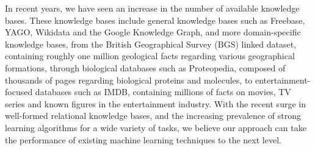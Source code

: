 \documentclass[twoside,11pt]{article}
\theoremstyle{definition}
\begin{document}
In recent years, we have seen an increase in the number of available knowledge bases. These knowledge bases include general knowledge bases such as Freebase, YAGO, Wikidata and the Google Knowledge Graph, and more domain-specific knowledge bases,  from the British Geographical Survey (BGS) linked dataset, containing roughly one million geological facts regarding various geographical formations, through biological databases such as Proteopedia, composed of thousands of pages regarding biological proteins and molecules, to entertainment-focused databases such as IMDB, containing millions of facts on movies, TV series and known figures in the entertainment industry. 
With the recent surge in well-formed relational knowledge bases,
and the increasing prevalence of strong learning algorithms for a wide variety of tasks,
we believe our approach can take the performance of existing machine learning techniques to the next level.

\clearpage
\vskip 0.2in


\end{document}
